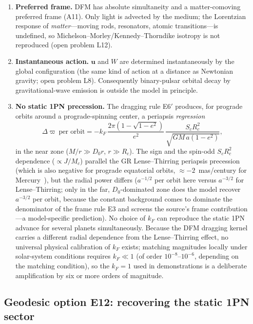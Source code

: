 \documentclass[aps,reprint,amsmath,amssymb,nofootinbib,superscriptaddress,floatfix]{revtex4-2}
\newcommand{\vect}[1]{\bm{#1}}
\newcommand{\Dz}{D_0}
\begin{document}
\begin{enumerate}
\item {\bf Preferred frame.}
DFM has absolute simultaneity and a matter-comoving preferred frame
(A11).
Only light is advected by the medium; the Lorentzian response of
\emph{matter}---moving rods, resonators, atomic transitions---is
undefined, so Michelson--Morley/Kennedy--Thorndike isotropy is not
reproduced (open problem L12).

\item {\bf Instantaneous action.}
$\vect{u}$ and $W$ are determined instantaneously by the global
configuration (the same kind of action at a distance as Newtonian
gravity; open problem L8).
Consequently binary-pulsar orbital decay by gravitational-wave
emission is outside the model in principle.

\item {\bf No static 1PN precession.}
The dragging rule E6$'$ produces, for prograde orbits around a
prograde-spinning center, a periapsis \emph{regression}
\begin{equation}
\Delta\varpi\ \text{per orbit}
 = -k_F\,\frac{2\pi\left(1-\sqrt{1-e^2}\right)}{e^2}\,
 \frac{S_cR_c^2}{\sqrt{GM\,a(1-e^2)}},
\label{eq:prec}
\end{equation}
in the near zone ($M/r \gg \Dz r$, $r \gg R_c$).
The sign and the spin-odd $S_cR_c^2$ dependence ($\propto J/M_c$)
parallel the GR Lense--Thirring periapsis precession (which is also
negative for
prograde equatorial orbits, $\approx -2$~mas/century for
Mercury~\cite{IorioMercury2011,IorioEtAl2011}), but the radial power differs
($a^{-1/2}$ per orbit here versus $a^{-3/2}$ for Lense--Thirring;
only in the far, $\Dz$-dominated zone does the model recover
$a^{-3/2}$ per orbit, because the constant background comes to
dominate the denominator of the frame rule E3 and screens the
source's frame contribution---a
model-specific prediction).
No choice of $k_F$ can reproduce the static 1PN advance for several
planets simultaneously.
Because the DFM dragging kernel carries a different radial dependence
from the Lense--Thirring effect, no universal physical calibration of
$k_F$ exists; matching magnitudes locally under solar-system
conditions requires $k_F \ll 1$ (of order $10^{-8}$--$10^{-6}$,
depending on the matching condition), so the $k_F = 1$ used in
demonstrations is a deliberate amplification by six or more orders of
magnitude.
\end{enumerate}

\subsection{Geodesic option E12: recovering the static 1PN sector}
\label{sec:e12}
\end{document}
